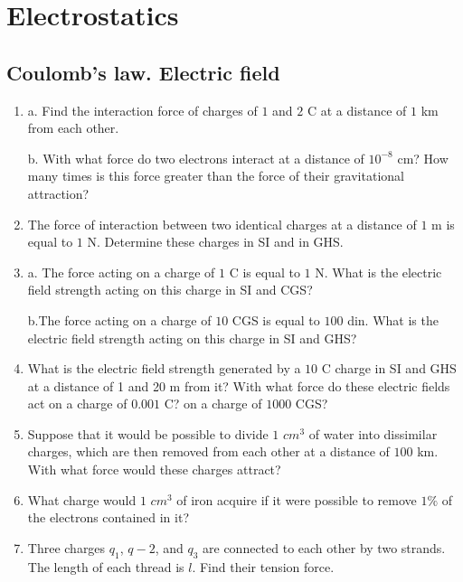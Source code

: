 \documentclass{article}
\begin{document}
\section{Electrostatics}

\subsection{Coulomb's law. Electric field}

\begin{enumerate}[label=6.1.\arabic*]

\item a. Find the interaction force of charges of $1$ and $2$ C at a distance of $1$ km from each other. 

b. With what force do two electrons interact at a distance of $10^{-8}$ cm? How many times is this force greater than the force of their gravitational attraction?

\item The force of interaction between two identical charges at a distance of $1$ m is equal to $1$ N. Determine these charges in SI and in GHS.

\item a. The force acting on a charge of $1$ C is equal to $1$ N. What is the electric field strength acting on this charge in SI and CGS? 

b.The force acting on a charge of $10$ CGS is equal to $100$ din. What is the electric field strength acting on this charge in SI and GHS?

\item What is the electric field strength generated by a $10$ C charge in SI and GHS at a distance of 1 and 20 m from it? With what force do these electric fields act on a charge of $0.001$ C? on a charge of $1000$ CGS?

\item Suppose that it would be possible to divide $1$ $cm^3$ of water into dissimilar charges, which are then removed from each other at a distance of $100$ km. With what force would these charges attract?

\item What charge would $1$ $cm^3$ of iron acquire if it were possible to remove $1\%$ of the electrons contained in it?

\item Three charges $q_1$, $q-2$, and $q_3$ are connected to each other by two strands. The length of each thread is $l$. Find their tension force.


\end{enumerate}
\end{document}
